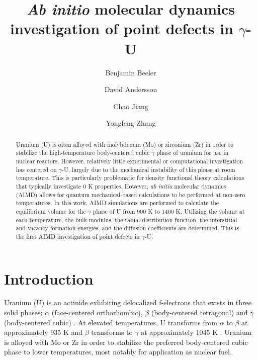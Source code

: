 \documentclass[review]{elsarticle}
\begin{document}
\begin{frontmatter}
\title{\textit{Ab initio} molecular dynamics investigation of point defects in $\gamma$-U}

\author[inl]{Benjamin Beeler}
\author[lanl]{David Andersson}
\author[inl]{Chao Jiang}
\author[inl]{Yongfeng Zhang}
\address[inl]{Idaho National Laboratory, Idaho Falls, ID 83415}
\address[lanl]{Los Alamos National Laboratory, Los Alamos, NM 87545}

\begin{abstract}

Uranium (U) is often alloyed with molybdenum (Mo) or zirconium (Zr) in order to stabilize the high-temperature body-centered cubic $\gamma$ phase of uranium for use in nuclear reactors. However, relatively little experimental or computational investigation has centered on $\gamma$-U, largely due to the mechanical instability of this phase at room temperature. This is particularly problematic for density functional theory calculations that typically investigate 0 K properties. However, \textit{ab initio} molecular dynamics (AIMD) allows for quantum mechanical-based calculations to be performed at non-zero temperatures. In this work, AIMD simulations are performed to calculate the equilibrium volume for the $\gamma$ phase of U from 900 K to 1400 K. Utilizing the volume at each temperature, the bulk modulus, the radial distribution function, the interstitial and vacancy formation energies, and the diffusion coefficients are determined. This is the first AIMD investigation of point defects in $\gamma$-U. 

\end{abstract}
\end{frontmatter}

\section{Introduction}

Uranium (U) is an actinide exhibiting delocalized f-electrons that exists in three solid phases: $\alpha$ (face-centered orthorhombic), $\beta$ (body-centered tetragonal) and $\gamma$ (body-centered cubic) \cite{yoo1998}. At elevated temperatures, U transforms from $\alpha$ to $\beta$ at approximately 935 K and $\beta$ transforms to $\gamma$ at approximately 1045 K \cite{soderlind1998}. Uranium is alloyed with Mo or Zr in order to stabilize the preferred body-centered cubic phase to lower temperatures, most notably for application as nuclear fuel. 
\end{document}
